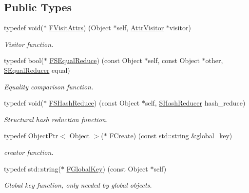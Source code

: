 \subsection*{Public Types}
\begin{DoxyCompactItemize}
\item 
typedef void($\ast$ \hyperlink{classtvm_1_1ReflectionVTable_a486eb682af89ac025c0db1f8f6045b95}{F\+Visit\+Attrs}) (Object $\ast$self, \hyperlink{classtvm_1_1AttrVisitor}{Attr\+Visitor} $\ast$visitor)
\begin{DoxyCompactList}\small\item\em Visitor function. \end{DoxyCompactList}\item 
typedef bool($\ast$ \hyperlink{classtvm_1_1ReflectionVTable_a656516c928f74d7b6345abd8c8f04358}{F\+S\+Equal\+Reduce}) (const Object $\ast$self, const Object $\ast$other, \hyperlink{classtvm_1_1SEqualReducer}{S\+Equal\+Reducer} equal)
\begin{DoxyCompactList}\small\item\em Equality comparison function. \end{DoxyCompactList}\item 
typedef void($\ast$ \hyperlink{classtvm_1_1ReflectionVTable_a08566817a33d96cd486a780afe88aad1}{F\+S\+Hash\+Reduce}) (const Object $\ast$self, \hyperlink{classtvm_1_1SHashReducer}{S\+Hash\+Reducer} hash\+\_\+reduce)
\begin{DoxyCompactList}\small\item\em Structural hash reduction function. \end{DoxyCompactList}\item 
typedef Object\+Ptr$<$ Object $>$($\ast$ \hyperlink{classtvm_1_1ReflectionVTable_adf61fde4dfac8d1cb59159db6722b335}{F\+Create}) (const std\+::string \&global\+\_\+key)
\begin{DoxyCompactList}\small\item\em creator function. \end{DoxyCompactList}\item 
typedef std\+::string($\ast$ \hyperlink{classtvm_1_1ReflectionVTable_abe09d73c5ea2c51f5cfa30471b8f89ef}{F\+Global\+Key}) (const Object $\ast$self)
\begin{DoxyCompactList}\small\item\em Global key function, only needed by global objects. \end{DoxyCompactList}\end{DoxyCompactItemize}
